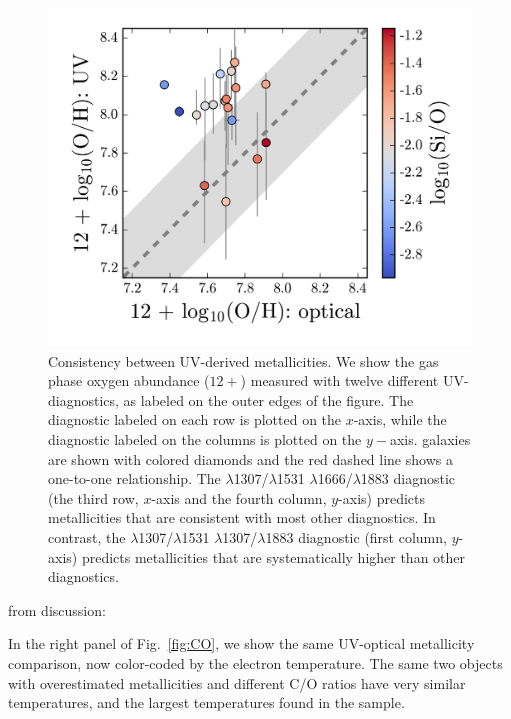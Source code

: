 \begin{figure}
  \begin{center}
    \includegraphics[width=\linewidth]{figs/f6.png}
    \caption{Consistency between UV-derived metallicities. We show the gas phase oxygen abundance ($12+$\logOH) measured with twelve different UV-diagnostics, as labeled on the outer edges of the figure. The diagnostic labeled on each row is plotted on the $x$-axis, while the diagnostic labeled on the columns is plotted on the $y-$axis. \mage galaxies are shown with colored diamonds and the red dashed line shows a one-to-one relationship. The \SiuII$\lambda$1307/\SiuII$\lambda$1531 \vs \oiii$\lambda$1666/\SiuIII$\lambda$1883 diagnostic (the third row, $x$-axis and the fourth column, $y$-axis) predicts metallicities that are consistent with most other diagnostics. In contrast, the \SiuII$\lambda$1307/\SiuII$\lambda$1531 \vs \SiuII$\lambda$1307/\SiuIII$\lambda$1883 diagnostic (first column, $y$-axis) predicts metallicities that are systematically higher than other diagnostics.}
    \label{fig:UVUV}
  \end{center}
\end{figure}

 from discussion:
 
In the right panel of Fig.~\ref{fig:CO}, we show the same UV-optical metallicity comparison, now color-coded by the \oiii electron temperature. The same two objects with overestimated metallicities and different C/O ratios have very similar temperatures, and the largest temperatures found in the \citet{Berg+2016} sample.

